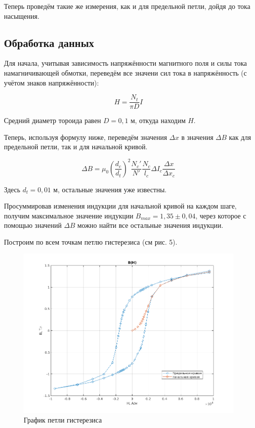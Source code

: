 Теперь проведём такие же измерения, как и для предельной петли, дойдя до тока насыщения. 

\subsection{Обработка данных}  

Для начала, учитывая зависимость напряжённости магнитного поля и силы тока намагничивающей обмотки, переведём все значени сил тока в напряжённость (с учётом знаков напряжённости):

\begin{equation}
    H = \frac{N_t}{\pi D} I
\end{equation}

Средний диаметр тороида равен $D = 0,1$ м, откуда находим $H$.

Теперь, используя формулу ниже, переведём значения $\Delta x$ в значения $\Delta B$ как для предельной петли, так и для начальной кривой.

\begin{equation}
    \label{eq:B2}
    \Delta B = \mu_0 \left(\frac{d_c}{d_t}\right)^2 \frac{N_{c}'}{N'} \frac{N_{c}}{l_c} \Delta I_c \frac{\Delta x}{\Delta x_c}
\end{equation}

Здесь $d_t = 0,01$ м, остальные значения уже известны.

Просуммировав изменения индукции для начальной кривой на каждом шаге, получим максимальное значение индукции $B_{max} = 1,35 \pm 0,04$, через которое с помощью значений $\Delta B$ можно найти все остальные значения индукции.

Построим по всем точкам петлю гистерезиса (см рис. 5).

\begin{figure}[h!]
    \centering
    \includegraphics[width = 14 cm]{images/gist.png}
    \caption{График петли гистерезиса}
    \label{gist}
\end{figure}

